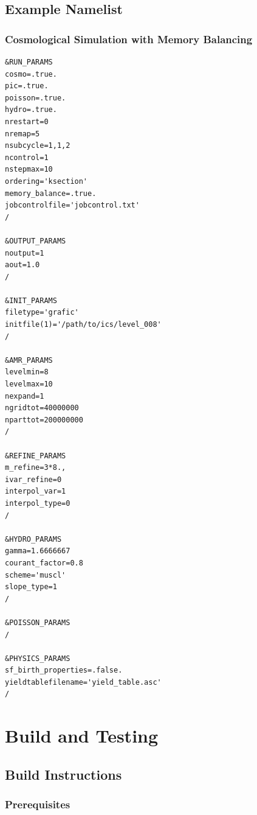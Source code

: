 \documentclass[11pt,fleqn]{book}
\begin{document}
\chapter{Example Namelist}

\section{Cosmological Simulation with Memory Balancing}

\begin{codebox}
\begin{lstlisting}[style=fortran,numbers=none]
&RUN_PARAMS
cosmo=.true.
pic=.true.
poisson=.true.
hydro=.true.
nrestart=0
nremap=5
nsubcycle=1,1,2
ncontrol=1
nstepmax=10
ordering='ksection'
memory_balance=.true.
jobcontrolfile='jobcontrol.txt'
/

&OUTPUT_PARAMS
noutput=1
aout=1.0
/

&INIT_PARAMS
filetype='grafic'
initfile(1)='/path/to/ics/level_008'
/

&AMR_PARAMS
levelmin=8
levelmax=10
nexpand=1
ngridtot=40000000
nparttot=200000000
/

&REFINE_PARAMS
m_refine=3*8.,
ivar_refine=0
interpol_var=1
interpol_type=0
/

&HYDRO_PARAMS
gamma=1.6666667
courant_factor=0.8
scheme='muscl'
slope_type=1
/

&POISSON_PARAMS
/

&PHYSICS_PARAMS
sf_birth_properties=.false.
yieldtablefilename='yield_table.asc'
/
\end{lstlisting}
\end{codebox}


\part{Build and Testing}

\chapter{Build Instructions}
\label{ch:build}

\section{Prerequisites}
\end{document}
